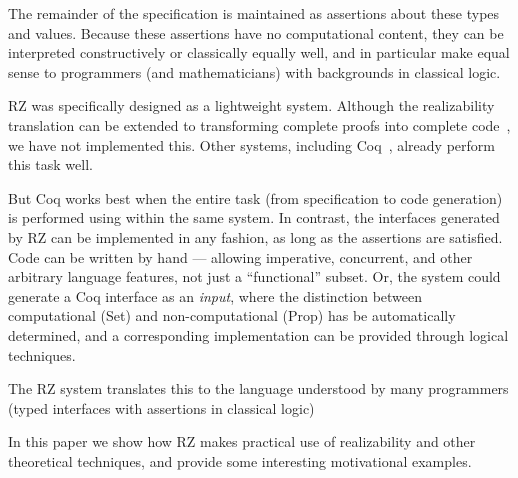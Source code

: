 The remainder of the specification is maintained as assertions about
these types and values. Because these assertions have no computational
content, they can be interpreted constructively or classically equally
well, and in particular make equal sense to programmers (and
mathematicians) with backgrounds in classical logic.

\bigskip

RZ was specifically designed as a lightweight system. Although the realizability
translation can be extended to transforming complete proofs into complete
code~\cite{komagata+:tr95}, we have not implemented this.  Other systems, including Coq~\cite{coq}, already perform this task well.  

But Coq works best when the entire task (from specification to code
generation) is performed using within the same system. In contrast, the
interfaces generated by RZ can be implemented in any fashion, as long
as the assertions are satisfied. Code can be written by hand ---
allowing imperative, concurrent, and other arbitrary language features,
not just a ``functional'' subset. Or, the system could generate a Coq
interface as an \emph{input}, where the distinction between
computational (Set) and non-computational (Prop) has be automatically
determined, and a corresponding implementation can be provided through
logical techniques.

The RZ system translates this to the language understood by many programmers (typed interfaces with assertions in classical logic)

\bigskip

In this paper we show how RZ makes practical use of realizability and
other theoretical techniques, and provide some interesting motivational
examples.


